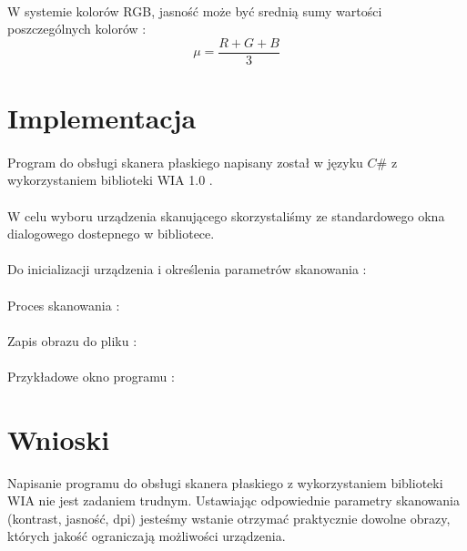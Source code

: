 \documentclass[wide,a4paper,titlepage,12pt] {article}
\begin{document}
\paragraph{} %
\label{par:}
W systemie kolorów RGB, jasność może być srednią sumy wartości poszczególnych kolorów :
\begin{equation}
    \mu = \frac{R+G+B}{3}
\end{equation}
\section{Implementacja}
\paragraph{} %
\label{par:}
Program do obsługi skanera płaskiego napisany został w języku $C\#$ z wykorzystaniem biblioteki WIA 1.0 .

\paragraph{} %
\label{}
W celu wyboru urządzenia skanującego skorzystaliśmy ze standardowego okna dialogowego dostepnego w bibliotece.


\paragraph{}
Do inicializacji urządzenia i określenia parametrów skanowania : 

\paragraph{} %
\label{par:}
Proces skanowania :

\paragraph{} %
\label{par:}
Zapis obrazu do pliku :

\paragraph{} %
\label{par:}
Przykładowe okno programu :


\section{Wnioski}
Napisanie programu do obsługi skanera płaskiego z wykorzystaniem biblioteki WIA nie jest zadaniem trudnym. Ustawiając odpowiednie parametry skanowania (kontrast, jasność, dpi) jesteśmy wstanie otrzymać praktycznie dowolne obrazy, których jakość ograniczają możliwości urządzenia.
\paragraph{}
\end{document}
